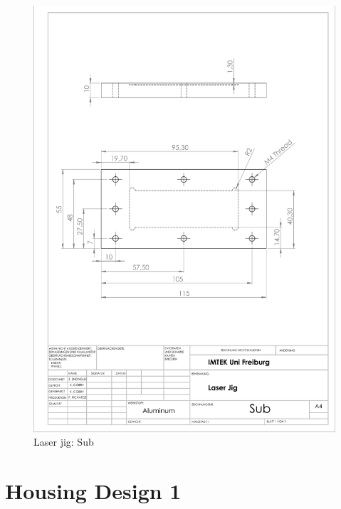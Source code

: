 \clearpage

\begin{figure}[h]%
\centering
\includegraphics[width=1\textwidth]{figures/appendix/laserjigsub}%
\caption{Laser jig: Sub}%
\label{laserjigsub}%
\end{figure}

\clearpage

\section{Housing Design 1}

